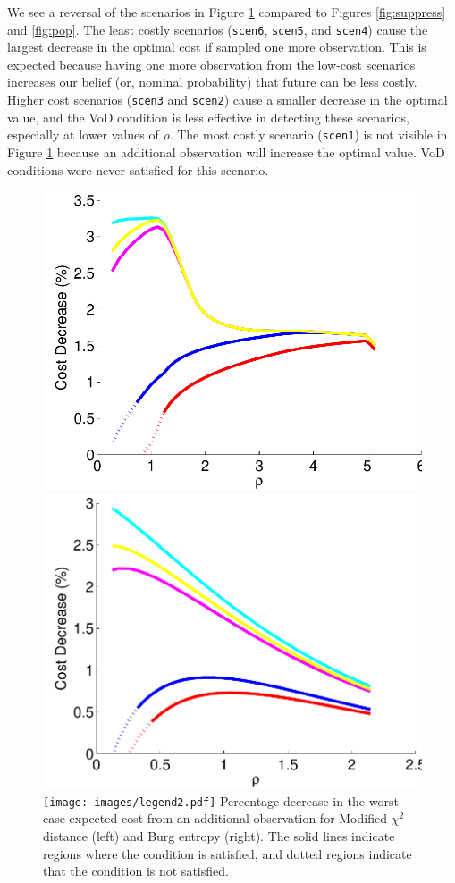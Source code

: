 \documentclass[opre,nonblindrev]{informs3} %
\begin{document}
We see a reversal of the scenarios in Figure \ref{fig:value} compared to Figures \ref{fig:suppress} and \ref{fig:pop}. 
The least costly scenarios (\texttt{scen6}, \texttt{scen5}, and \texttt{scen4}) cause the largest decrease in the optimal cost if sampled one more observation.
This is expected because having one more observation from the low-cost scenarios increases our belief (or, nominal probability) that future can be less costly.  
Higher cost scenarios (\texttt{scen3} and \texttt{scen2})  cause a smaller decrease in the optimal value, and the VoD condition is less effective in detecting these scenarios, especially at lower values of $\rho$. 
The most costly scenario (\texttt{scen1}) is not visible in Figure \ref{fig:value} because an additional observation will increase the optimal value.
VoD conditions were never satisfied for this scenario.


\begin{figure}
	\FIGURE
	{%
		\includegraphics*[width=.40\textwidth]{images/mchi2_decrease_condition}%
		\includegraphics*[width=.40\textwidth]{images/burg_decrease_condition}%
		\texttt{[image: images/legend2.pdf]}
	}
	{
		Percentage decrease in the worst-case expected cost from an additional observation for Modified $\chi^2$-distance (left) and Burg entropy (right).
		The solid lines indicate regions where the condition is satisfied, and dotted regions indicate that the condition is not satisfied.
		\label{fig:value}
	}
	{}
\end{figure}
\end{document}
